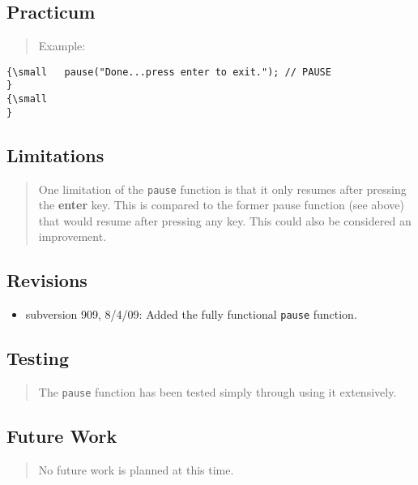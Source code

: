 \subsection*{Practicum}

\begin{quotation}
Example:{\small }
\end{quotation}

\begin{verbatim}
{\small   pause("Done...press enter to exit."); // PAUSE
}
{\small   
}
\end{verbatim}

\subsection*{Limitations}

\begin{quotation}
One limitation of the \texttt{pause} function is that it only resumes after
pressing the \textbf{enter} key. This is compared to the former pause
function (see above) that would resume after pressing any key. This could
also be considered an improvement.
\end{quotation}

\subsection*{Revisions}

\begin{itemize}
\item subversion 909, 8/4/09: Added the fully functional \texttt{pause}
function.
\end{itemize}

\subsection*{Testing}

\begin{quotation}
The \texttt{pause} function has been tested simply through using it
extensively.
\end{quotation}

\subsection*{Future Work}

\begin{quotation}
No future work is planned at this time.
\end{quotation}


%

